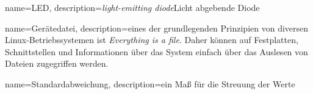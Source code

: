 {
  name=LED,
  description={\emph{light-emitting diode}\newline Licht abgebende Diode}
}

{
  name=Gerätedatei,
  description={eines der grundlegenden Prinzipien von diversen Linux-Betriebssystemen ist \emph{Everything is a file}.\newline
  Daher können auf Festplatten, Schnittstellen und Informationen über das System einfach über das Auslesen von Dateien zugegriffen werden.
  }
}

{
  name=Standardabweichung,
  description={ein Maß für die Streuung der Werte}
}
